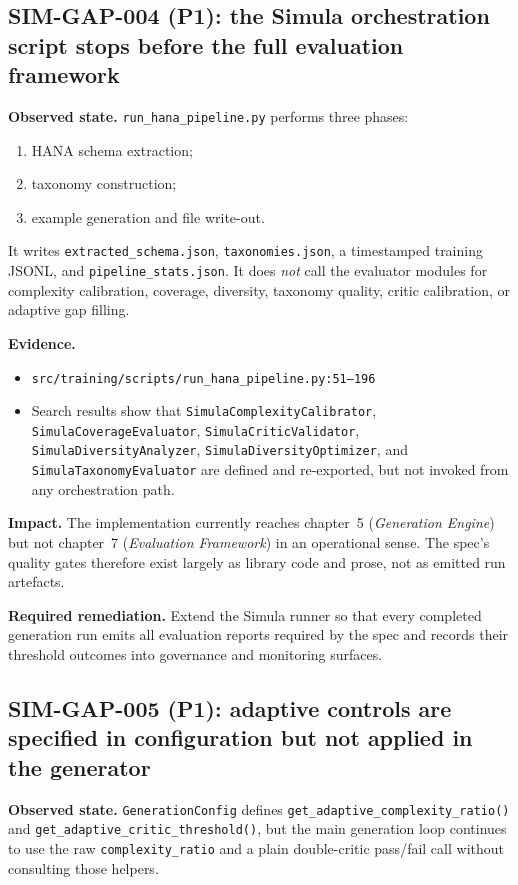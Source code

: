 \subsection*{SIM-GAP-004 (P1): the Simula orchestration script stops before the full evaluation framework}
\textbf{Observed state.}
\texttt{run\_hana\_pipeline.py} performs three phases:
\begin{enumerate}[label=\arabic*.]
  \item HANA schema extraction;
  \item taxonomy construction;
  \item example generation and file write-out.
\end{enumerate}
It writes \texttt{extracted\_schema.json},
\texttt{taxonomies.json}, a timestamped training JSONL, and
\texttt{pipeline\_stats.json}. It does \emph{not} call the evaluator
modules for complexity calibration, coverage, diversity, taxonomy
quality, critic calibration, or adaptive gap filling.

\textbf{Evidence.}
\begin{itemize}
  \item \texttt{src/training/scripts/run\_hana\_pipeline.py:51--196}
  \item Search results show that
    \texttt{SimulaComplexityCalibrator},
    \texttt{SimulaCoverageEvaluator},
    \texttt{SimulaCriticValidator},
    \texttt{SimulaDiversityAnalyzer},
    \texttt{SimulaDiversityOptimizer}, and
    \texttt{SimulaTaxonomyEvaluator} are defined and re-exported, but
    not invoked from any orchestration path.
\end{itemize}

\textbf{Impact.}
The implementation currently reaches chapter~5
(\emph{Generation Engine}) but not chapter~7
(\emph{Evaluation Framework}) in an operational sense. The spec's
quality gates therefore exist largely as library code and prose, not
as emitted run artefacts.

\textbf{Required remediation.}
Extend the Simula runner so that every completed generation run emits
all evaluation reports required by the spec and records their
threshold outcomes into governance and monitoring surfaces.

\subsection*{SIM-GAP-005 (P1): adaptive controls are specified in configuration but not applied in the generator}
\textbf{Observed state.}
\texttt{GenerationConfig} defines
\texttt{get\_adaptive\_complexity\_ratio()} and
\texttt{get\_adaptive\_critic\_threshold()}, but the main generation
loop continues to use the raw \texttt{complexity\_ratio} and a plain
double-critic pass/fail call without consulting those helpers.

